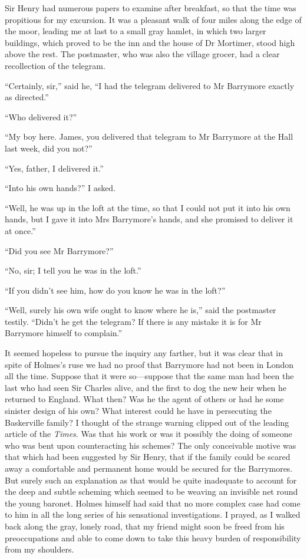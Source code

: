 \documentclass[paper=5.5in:8.5in,BCOR=7mm,twoside,DIV=calc,12pt,usegeometry,openany,chapterprefix,endperiod]{scrbook} %
\begin{document}
Sir Henry had numerous papers to examine after breakfast, so that the time was propitious for my excursion. It was a pleasant walk of four miles along the edge of the moor, leading me at last to a small gray hamlet, in which two larger buildings, which proved to be the inn and the house of Dr Mortimer, stood high above the rest. The postmaster, who was also the village grocer, had a clear recollection of the telegram.

\enquote{Certainly, sir,} said he, \enquote{I had the telegram delivered to Mr Barrymore exactly as directed.}

\enquote{Who delivered it?}

\enquote{My boy here. James, you delivered that telegram to Mr Barrymore at the Hall last week, did you not?}

\enquote{Yes, father, I delivered it.}

\enquote{Into his own hands?} I asked.

\enquote{Well, he was up in the loft at the time, so that I could not put it into his own hands, but I gave it into Mrs Barrymore's hands, and she promised to deliver it at once.}

\enquote{Did you see Mr Barrymore?}

\enquote{No, sir; I tell you he was in the loft.}

\enquote{If you didn't see him, how do you know he was in the loft?}

\enquote{Well, surely his own wife ought to know where he is,} said the postmaster testily. \enquote{Didn't he get the telegram? If there is any mistake it is for Mr Barrymore himself to complain.}

It seemed hopeless to pursue the inquiry any farther, but it was clear that in spite of Holmes's ruse we had no proof that Barrymore had not been in London all the time. Suppose that it were so\nobreakdash---suppose that the same man had been the last who had seen Sir Charles alive, and the first to dog the new heir when he returned to England. What then? Was he the agent of others or had he some sinister design of his own? What interest could he have in persecuting the Baskerville family? I thought of the strange warning clipped out of the leading article of the \textit{Times}. Was that his work or was it possibly the doing of someone who was bent upon counteracting his schemes? The only conceivable motive was that which had been suggested by Sir Henry, that if the family could be scared away a comfortable and permanent home would be secured for the Barrymores. But surely such an explanation as that would be quite inadequate to account for the deep and subtle scheming which seemed to be weaving an invisible net round the young baronet. Holmes himself had said that no more complex case had come to him in all the long series of his sensational investigations. I prayed, as I walked back along the gray, lonely road, that my friend might soon be freed from his preoccupations and able to come down to take this heavy burden of responsibility from my shoulders.
\end{document}
